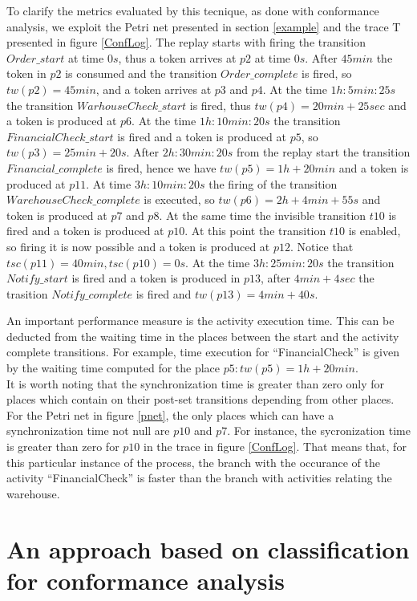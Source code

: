 \documentclass[11pt]{article}
\begin{document}
To clarify the metrics evaluated by this tecnique, as done with conformance analysis, we exploit the Petri net  presented in section \ref{example} and the trace T presented in figure \ref{ConfLog}. The replay starts with firing the transition $Order\_start$ at time $0s$, thus a token arrives at $p2$ at time $0s$. After $45 min$ the token in $p2$ is consumed and the transition $Order\_complete$ is fired, so $tw(p2)=45min$, and a token arrives at $p3$ and $p4$. At the time $1h:5min:25s$ the transition $WarhouseCheck\_start$ is fired, thus $tw(p4)=20min+25sec$ and a token is produced at $p6$. At the time $1h:10min:20s$ the transition $FinancialCheck\_start$ is fired and a token is produced at $p5$, so $tw(p3)=25min+20s$. After $2h:30min:20s$ from the replay start the transition $Financial\_complete$ is fired, hence we have $tw(p5)=1h+20min$ and a token is produced at $p11$. At time $3h:10min:20s$ the firing of the transition $WarehouseCheck\_complete$ is executed, so $tw(p6)=2h+4min+55s$ and token is produced at $p7$ and $p8$. At the same time the invisible transition $t10$ is fired and a token is produced at $p10$. At this point the transition $t10$ is enabled, so firing it is now possible and a token is produced at $p12$. Notice that $tsc(p11)=40min, tsc(p10)=0s$. At the time $3h:25min:20s$ the transition $Notify\_start$ is fired and a token is produced in $p13$, after $4min+4sec$ the trasition $Notify\_complete$ is fired and $tw(p13) = 4min+40s$.

An important performance measure is the activity execution time. This can be deducted from the waiting time in the places between the start and the activity complete transitions. For example, time execution for ``FinancialCheck'' is given by the waiting time computed for the place $p5: tw(p5)=1h+20min$.\\

It is worth noting that the synchronization time is greater than zero only for places which contain on their post-set transitions depending from other places. For the Petri net in figure \ref{pnet}, the only places which can have a synchronization time not null are $p10$ and $p7$. For instance, the sycronization time is greater than zero for $p10$ in the trace in figure \ref{ConfLog}. That means that, for this particular instance of the process, the branch with the occurance of the activity ``FinancialCheck'' is faster than the branch with activities relating the warehouse.

\section{An approach based on classification for conformance analysis}\label{ClassConformance}
\end{document}
